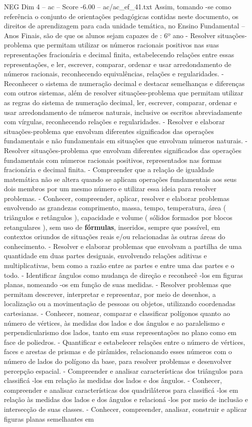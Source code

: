 \begin{textsample}{NEG Dim 4 – ac – Score -6.00 – ac/ac\_ef\_41.txt}
Assim, tomando -se como referência o conjunto de orientações pedagógicas contidas neste documento, os direitos de aprendizagem para cada unidade temática, no Ensino Fundamental – Anos Finais, são de que os alunos sejam capazes de : 6º ano - Resolver situações-problema que permitam utilizar os números racionais positivos nas suas representações fracionária e decimal finita, estabelecendo relações entre essas representações, e ler, escrever, comparar, ordenar e usar arredondamento de números racionais, reconhecendo equivalências, relações e regularidades. - Reconhecer o sistema de numeração decimal e destacar semelhanças e diferenças com outros sistemas, além de resolver situações-problema que permitam utilizar as regras do sistema de numeração decimal, ler, escrever, comparar, ordenar e usar arredondamento de números naturais, inclusive os escritos abreviadamente com vírgulas, reconhecendo relações e regularidades. - Resolver e elaborar situações-problema que envolvam diferentes significados das operações fundamentais e não fundamentais em situações que envolvam números naturais. - Resolver situações-problema que envolvam diferentes significados das operações fundamentais com números racionais positivos, representados nas formas fracionária e decimal finita. - Compreender que a relação de igualdade matemática não se altera quando se aplicam operações fundamentais aos seus dois membros por um mesmo número e utilizar essa ideia para resolver problemas. - Conhecer, compreender, aplicar, resolver e elaborar problemas envolvendo as grandezas comprimento, massa, tempo, temperatura, área ( triângulos e retângulos ), capacidade e volume ( sólidos formados por blocos retangulares ), sem uso de \textbf{fórmulas}, inseridos, sempre que possível, em contextos oriundos de situações reais e/ou relacionadas às outras áreas do conhecimento. - Resolver e elaborar problemas que envolvam a partilha de uma quantidade em duas partes desiguais, envolvendo relações aditivas e multiplicativas, bem como a razão entre as partes e entre uma das partes e o todo. - Identificar ângulos como mudança de direção e reconhecê -los em figuras planas, nomeando -os em função de suas medidas. - Resolver problemas que permitam descrever, interpretar e representar, por meio de desenhos, a localização ou a movimentação de pessoas ou objetos, utilizando coordenadas cartesianas. - Conhecer, nomear, comparar e classificar polígonos quanto ao número de vértices, às medidas dos lados e dos ângulos e ao paralelismo e perpendicularismo dos lados, tanto em suas representações no plano como em face de poliedros. - Quantificar e estabelecer relações entre o número de vértices, faces e arestas de prismas e de pirâmides, relacionando esses números com o número de lados do polígono da base, para resolver problemas e desenvolver percepção espacial. - Compreender e analisar características dos triângulos para classificá -los em relação às medidas dos lados e dos ângulos. - Conhecer, compreender e analisar características dos quadriláteros para classificá -los em relação às medidas dos lados e dos ângulos e relacioná -los por meio de inclusão e intersecção de suas classes. - Conhecer, compreender, analisar, construir e aplicar figuras planas semelhantes em 
\end{textsample}
